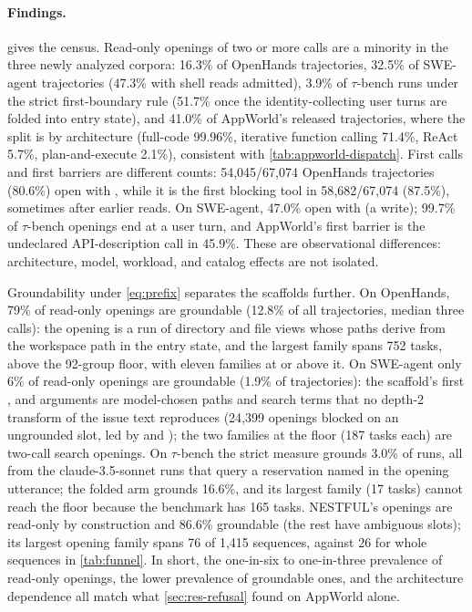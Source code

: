 \paragraph{Findings.}
 gives the census. Read-only openings of two or more
calls are a minority in the three newly analyzed corpora: 16.3\% of OpenHands
trajectories, 32.5\% of SWE-agent trajectories (47.3\% with shell reads
admitted), 3.9\% of $\tau$-bench runs under the strict first-boundary rule
(51.7\% once the identity-collecting user turns are folded into entry state),
and 41.0\% of AppWorld's released trajectories, where the split is by
architecture (full-code 99.96\%, iterative function calling 71.4\%, ReAct
5.7\%, plan-and-execute 2.1\%), consistent with \cref{tab:appworld-dispatch}.
First calls and first barriers are different counts: 54{,}045/67{,}074
OpenHands trajectories (80.6\%) open with , while it is the first
blocking tool in 58{,}682/67{,}074 (87.5\%), sometimes after earlier reads.
On SWE-agent, 47.0\% open with  (a write); 99.7\% of
$\tau$-bench openings end at a user turn, and AppWorld's first barrier is the
undeclared API-description call in 45.9\%. These are observational differences:
architecture, model, workload, and catalog effects are not isolated.

Groundability under \cref{eq:prefix} separates the scaffolds further.
On OpenHands, 79\% of read-only openings are groundable (12.8\% of all
trajectories, median three calls): the opening is a run of directory and file
views whose paths derive from the workspace path in the entry state, and the
largest family spans 752 tasks, above the 92-group floor, with eleven families
at or above it. On SWE-agent only 6\% of read-only openings are groundable
(1.9\% of trajectories): the scaffold's first , 
and  arguments are model-chosen paths and search terms that
no depth-2 transform of the issue text reproduces (24{,}399 openings blocked
on an ungrounded slot, led by  and );
the two families at the floor (187 tasks each) are two-call search openings.
On $\tau$-bench the strict measure grounds 3.0\% of runs, all from the
claude-3.5-sonnet runs that query a reservation named in the opening
utterance; the folded arm grounds 16.6\%, and its largest family (17 tasks)
cannot reach the floor because the benchmark has 165 tasks. NESTFUL's openings
are read-only by construction and 86.6\% groundable (the rest have ambiguous
slots); its largest opening family spans 76 of 1{,}415 sequences, against 26
for whole sequences in \cref{tab:funnel}. In short, the one-in-six to
one-in-three prevalence of read-only openings, the lower prevalence of
groundable ones, and the architecture dependence all match what
\cref{sec:res-refusal} found on AppWorld alone.

